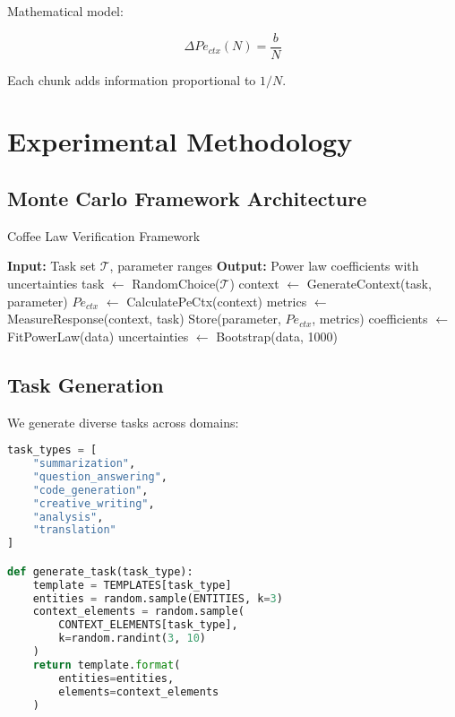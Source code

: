 \documentclass[conference]{IEEEtran}
\begin{document}
Mathematical model:

\begin{equation}
\Delta Pe_{ctx}(N) = \frac{b}{N}
\end{equation}

Each chunk adds information proportional to $1/N$.

\section{Experimental Methodology}

\subsection{Monte Carlo Framework Architecture}

\begin{algorithm}
\caption{Coffee Law Verification Framework}
\begin{algorithmic}
\STATE \textbf{Input:} Task set $\mathcal{T}$, parameter ranges
\STATE \textbf{Output:} Power law coefficients with uncertainties
\STATE
{}
            \STATE task $\leftarrow$ RandomChoice($\mathcal{T}$)
            \STATE context $\leftarrow$ GenerateContext(task, parameter)
            \STATE $Pe_{ctx}$ $\leftarrow$ CalculatePeCtx(context)
            \STATE metrics $\leftarrow$ MeasureResponse(context, task)
            \STATE Store(parameter, $Pe_{ctx}$, metrics)
        \ENDFOR
    \ENDFOR
    \STATE coefficients $\leftarrow$ FitPowerLaw(data)
    \STATE uncertainties $\leftarrow$ Bootstrap(data, 1000)
\ENDFOR
\end{algorithmic}
\end{algorithm}

\subsection{Task Generation}

We generate diverse tasks across domains:

\begin{lstlisting}[language=Python, basicstyle=\small]
task_types = [
    "summarization",
    "question_answering", 
    "code_generation",
    "creative_writing",
    "analysis",
    "translation"
]

def generate_task(task_type):
    template = TEMPLATES[task_type]
    entities = random.sample(ENTITIES, k=3)
    context_elements = random.sample(
        CONTEXT_ELEMENTS[task_type], 
        k=random.randint(3, 10)
    )
    return template.format(
        entities=entities,
        elements=context_elements
    )
\end{lstlisting}
\end{document}

